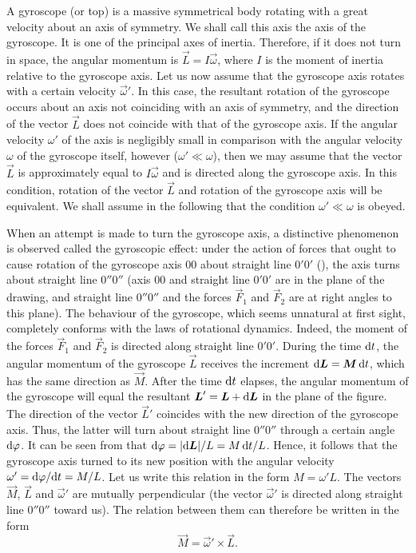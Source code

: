 A gyroscope (or top) is a massive symmetrical body rotating with a great velocity about an axis of symmetry. We shall call this axis the axis of the gyroscope. It is one of the principal axes of inertia. Therefore, if it does not turn in space, the angular momentum is $\vec{L}=I\vec{\omega}$, where $I$ is the moment of inertia relative to the gyroscope axis. Let us now assume that the gyroscope axis rotates with a certain velocity $\vec{\omega}'$. In this case, the resultant rotation of the gyroscope occurs about an axis not coinciding with an axis of symmetry, and the direction of the vector $\vec{L}$ does not coincide with that of the gyroscope axis. If the angular velocity $\omega'$ of the axis is negligibly small in comparison with the angular velocity $\omega$ of the gyroscope itself, however ($\omega'\ll\omega$), then we may assume that the vector $\vec{L}$ is approximately equal to $I\vec{\omega}$ and is directed along the gyroscope axis. In this condition, rotation of the vector $\vec{L}$ and rotation of the gyroscope axis will be equivalent. We shall assume in the following that the condition $\omega'\ll\omega$ is obeyed.

When an attempt is made to turn the gyroscope axis, a distinctive phenomenon is observed called the gyroscopic effect: under the action of forces that ought to cause rotation of the gyroscope axis $00$ about straight line $0'0'$ (), the axis turns about straight line $0''0''$ (axis $00$ and straight line $0'0'$ are in the plane of the drawing, and straight line $0''0''$ and the forces $\vec{F}_1$ and $\vec{F}_2$ are at right angles to this plane). The behaviour of the gyroscope, which seems unnatural at first sight, completely conforms with the laws of rotational dynamics. Indeed, the moment of the forces $\vec{F}_1$ and $\vec{F}_2$ is directed along straight line $0'0'$. During the time $\mathrm{d} t$, the angular momentum of the gyroscope $\vec{L}$ receives the increment $\mathrm{d}\boldsymbol{L}=\boldsymbol{M}\,\mathrm{d} t$, which has the same direction as $\vec{M}$. After the time $\mathrm{d} t$ elapses, the angular momentum of the gyroscope will equal the resultant $\boldsymbol{L}'=\boldsymbol{L}+\mathrm{d}\boldsymbol{L}$ in the plane of the figure. The direction of the vector $\vec{L}'$ coincides with the new direction of the gyroscope axis. Thus, the latter will turn about straight line $0''0''$ through a certain angle $\mathrm{d}\varphi$. It can be seen from  that $\mathrm{d}\varphi=|\mathrm{d}\boldsymbol{L}|/L=M\,\mathrm{d} t/L$. Hence, it follows that the gyroscope axis turned to its new position with the angular velocity $\omega'=\mathrm{d}\varphi/\mathrm{d} t=M/L$. Let us write this relation in the form $M=\omega'L$. The vectors $\vec{M}$, $\vec{L}$ and $\vec{\omega}'$ are mutually perpendicular (the vector $\vec{\omega}'$ is directed along straight line $0''0''$ toward us). The relation between them can therefore be written in the form
\begin{equation}\label{eq:5_69}
	\vec{M} = \vec{\omega}' \times \vec{L}.
\end{equation}

